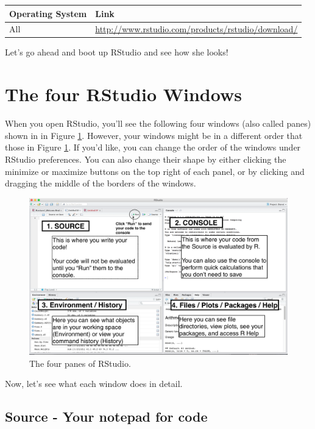 \documentclass[]{book}
\theoremstyle{definition}
\theoremstyle{definition}
\theoremstyle{remark}
\begin{document}
\begin{longtable}[]{@{}ll@{}}
\toprule
Operating System & Link\tabularnewline
\midrule
\endhead
All &
\url{http://www.rstudio.com/products/rstudio/download/}\tabularnewline
\bottomrule
\end{longtable}

Let's go ahead and boot up RStudio and see how she looks!

\section{The four RStudio Windows}\label{the-four-rstudio-windows}

When you open RStudio, you'll see the following four windows (also
called panes) shown in in Figure \ref{fig:rstudiowindows}. However, your
windows might be in a different order that those in Figure
\ref{fig:rstudiowindows}. If you'd like, you can change the order of the
windows under RStudio preferences. You can also change their shape by
either clicking the minimize or maximize buttons on the top right of
each panel, or by clicking and dragging the middle of the borders of the
windows.

\begin{figure}

{\centering \includegraphics[width=1\linewidth]{images/RStudio_Screenshot_Labels} 

}

\caption{The four panes of RStudio.}\label{fig:rstudiowindows}
\end{figure}

Now, let's see what each window does in detail.

\subsection{Source - Your notepad for
code}\label{source---your-notepad-for-code}
\end{document}

